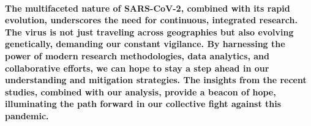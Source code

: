 \documentclass{article}
\begin{document}
\paragraph{The multifaceted nature of SARS-CoV-2, combined with its rapid evolution, underscores the need for continuous, integrated research. The virus is not just traveling across geographies but also evolving genetically, demanding our constant vigilance. By harnessing the power of modern research methodologies, data analytics, and collaborative efforts, we can hope to stay a step ahead in our understanding and mitigation strategies. The insights from the recent studies, combined with our analysis, provide a beacon of hope, illuminating the path forward in our collective fight against this pandemic.}
\printbibliography
\end{document}
